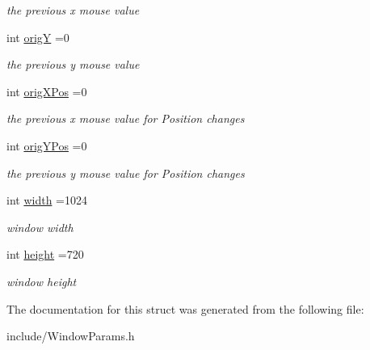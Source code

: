 \begin{DoxyCompactItemize}
\begin{DoxyCompactList}\small\item\em the previous x mouse value \end{DoxyCompactList}\item 
int \hyperlink{struct_win_params_a9e4ef1b5ef96c1f6bbe46bb10c11d59b}{origY} =0\hypertarget{struct_win_params_a9e4ef1b5ef96c1f6bbe46bb10c11d59b}{}\label{struct_win_params_a9e4ef1b5ef96c1f6bbe46bb10c11d59b}

\begin{DoxyCompactList}\small\item\em the previous y mouse value \end{DoxyCompactList}\item 
int \hyperlink{struct_win_params_ab07a11274084415333c1fd0a5fc03667}{orig\+X\+Pos} =0\hypertarget{struct_win_params_ab07a11274084415333c1fd0a5fc03667}{}\label{struct_win_params_ab07a11274084415333c1fd0a5fc03667}

\begin{DoxyCompactList}\small\item\em the previous x mouse value for Position changes \end{DoxyCompactList}\item 
int \hyperlink{struct_win_params_a5dc76afc1f5486221ee40eee3cb9a5ac}{orig\+Y\+Pos} =0\hypertarget{struct_win_params_a5dc76afc1f5486221ee40eee3cb9a5ac}{}\label{struct_win_params_a5dc76afc1f5486221ee40eee3cb9a5ac}

\begin{DoxyCompactList}\small\item\em the previous y mouse value for Position changes \end{DoxyCompactList}\item 
int \hyperlink{struct_win_params_abe7daa1f3fc56dc639141bcbee759c02}{width} =1024\hypertarget{struct_win_params_abe7daa1f3fc56dc639141bcbee759c02}{}\label{struct_win_params_abe7daa1f3fc56dc639141bcbee759c02}

\begin{DoxyCompactList}\small\item\em window width \end{DoxyCompactList}\item 
int \hyperlink{struct_win_params_a9b7c0ae0270bc1f7cfad6d95524b886b}{height} =720\hypertarget{struct_win_params_a9b7c0ae0270bc1f7cfad6d95524b886b}{}\label{struct_win_params_a9b7c0ae0270bc1f7cfad6d95524b886b}

\begin{DoxyCompactList}\small\item\em window height \end{DoxyCompactList}\end{DoxyCompactItemize}


The documentation for this struct was generated from the following file\+:\begin{DoxyCompactItemize}
\item 
include/Window\+Params.\+h\end{DoxyCompactItemize}
